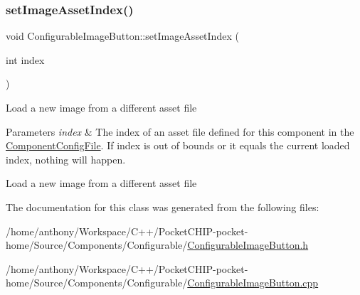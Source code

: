 \subsubsection{\texorpdfstring{set\+Image\+Asset\+Index()}{setImageAssetIndex()}}
{\footnotesize\ttfamily void Configurable\+Image\+Button\+::set\+Image\+Asset\+Index (\begin{DoxyParamCaption}\item[{int}]{index }\end{DoxyParamCaption})}

Load a new image from a different asset file


\begin{DoxyParams}{Parameters}
{\em index} & The index of an asset file defined for this component in the \mbox{\hyperlink{classComponentConfigFile}{Component\+Config\+File}}. If index is out of bounds or it equals the current loaded index, nothing will happen.\\
\hline
\end{DoxyParams}
Load a new image from a different asset file 

The documentation for this class was generated from the following files\+:\begin{DoxyCompactItemize}
\item 
/home/anthony/\+Workspace/\+C++/\+Pocket\+C\+H\+I\+P-\/pocket-\/home/\+Source/\+Components/\+Configurable/\mbox{\hyperlink{ConfigurableImageButton_8h}{Configurable\+Image\+Button.\+h}}\item 
/home/anthony/\+Workspace/\+C++/\+Pocket\+C\+H\+I\+P-\/pocket-\/home/\+Source/\+Components/\+Configurable/\mbox{\hyperlink{ConfigurableImageButton_8cpp}{Configurable\+Image\+Button.\+cpp}}\end{DoxyCompactItemize}
